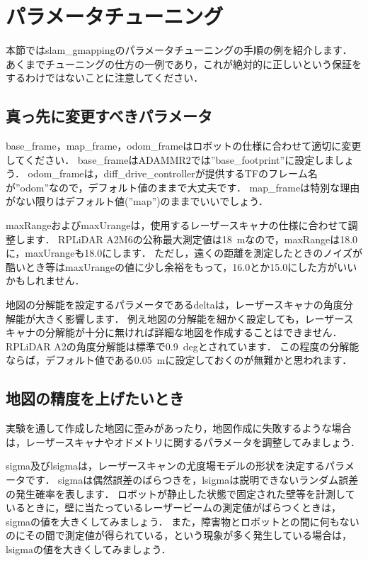 \documentclass[{../../master}]{subfiles}
\begin{document}
\section{パラメータチューニング}
\label{sec:gmapping_tuning}

本節では\textsf{slam\_gmapping}のパラメータチューニングの手順の例を紹介します．
あくまでチューニングの仕方の一例であり，これが絶対的に正しいという保証をするわけではないことに注意してください．

\subsection{真っ先に変更すべきパラメータ}

\textsf{base\_frame}，\textsf{map\_frame}，\textsf{odom\_frame}はロボットの仕様に合わせて適切に変更してください．
\textsf{base\_frame}はADAMMR2では\textsf{''base\_footprint''}に設定しましょう．
\textsf{odom\_frame}は，\textsf{diff\_drive\_controller}が提供するTFのフレーム名が\textsf{''odom''}なので，デフォルト値のままで大丈夫です．
\textsf{map\_frame}は特別な理由がない限りはデフォルト値(\textsf{''map''})のままでいいでしょう．

\textsf{maxRange}および\textsf{maxUrange}は，使用するレーザースキャナの仕様に合わせて調整します．
RPLiDAR A2M6の公称最大測定値は\SI{18}{m}なので，\textsf{maxRange}は18.0に，\textsf{maxUrange}も18.0にします．
ただし，遠くの距離を測定したときのノイズが酷いとき等は\textsf{maxUrange}の値に少し余裕をもって，16.0とか15.0にした方がいいかもしれません．

地図の分解能を設定するパラメータである\textsf{delta}は，レーザースキャナの角度分解能が大きく影響します．
例え地図の分解能を細かく設定しても，レーザースキャナの分解能が十分に無ければ詳細な地図を作成することはできません．
RPLiDAR A2の角度分解能は標準で\SI{0.9}{deg}とされています．
この程度の分解能ならば，デフォルト値である\SI{0.05}{m}に設定しておくのが無難かと思われます．

\subsection{地図の精度を上げたいとき}

実験を通して作成した地図に歪みがあったり，地図作成に失敗するような場合は，レーザースキャナやオドメトリに関するパラメータを調整してみましょう．

\textsf{sigma}及び\textsf{lsigma}は，レーザースキャンの尤度場モデルの形状を決定するパラメータです．
\textsf{sigma}は偶然誤差のばらつきを，\textsf{lsigma}は説明できないランダム誤差の発生確率を表します．
ロボットが静止した状態で固定された壁等を計測しているときに，壁に当たっているレーザービームの測定値がばらつくときは，\textsf{sigma}の値を大きくしてみましょう．
また，障害物とロボットとの間に何もないのにその間で測定値が得られている，という現象が多く発生している場合は，\textsf{lsigma}の値を大きくしてみましょう．
\end{document}
